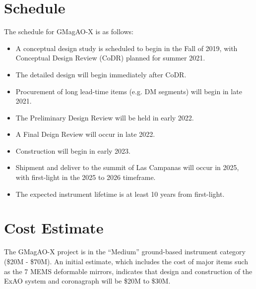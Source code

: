 \documentclass[12pt,preprint]{aastex}
\begin{document}
\section{Schedule}
The schedule for GMagAO-X is as follows:
\vspace{-10pt}
\begin{itemize} \itemsep 0pt
\item A conceptual design study is scheduled to begin in the Fall of 2019, with Conceptual Design Review (CoDR) planned for summer 2021.  
\item The detailed design will begin immediately after CoDR.
\item Procurement of long lead-time items (e.g. DM segments) will begin in late 2021.  
\item The Preliminary Design Review will be held in early 2022.
\item A Final Deign Review will occur in late 2022.
\item Construction will begin in early 2023.
\item Shipment and deliver to the summit of Las Campanas will occur in 2025, with first-light in the 2025 to 2026 timeframe.
\item The expected instrument lifetime is at least 10 years from first-light.  
\end{itemize}

\section{Cost Estimate}

The GMagAO-X project is in the ``Medium'' ground-based instrument category (\$20M - \$70M).  An initial estimate, which includes the cost of major items such as the 7 MEMS deformable mirrors, indicates that design and construction of the ExAO system and coronagraph will be \$20M to \$30M.   



\clearpage
\thispagestyle{empty}
\end{document}
